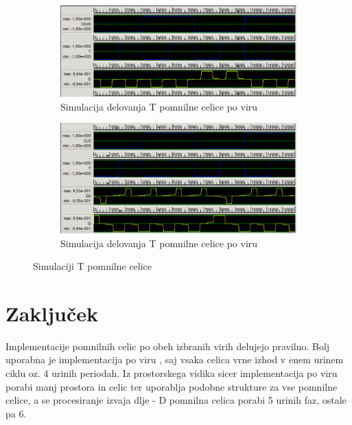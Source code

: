 \documentclass[a4paper, 11pt]{article}
\begin{document}
\begin{figure}[h!]
	\begin{subfigure}[b]{\textwidth}
	\includegraphics[width=\textwidth]{../img/vir_4/sim_t.png}
	\caption{Simulacija delovanja T pomnilne celice po viru \cite{quantum_dot}}
	\label{fig-t-1-sim}
	\end{subfigure}
	\begin{subfigure}[b]{\textwidth}
	\includegraphics[width=\textwidth]{../img/vir_5/sim_t.png}
	\caption{Simulacija delovanja T pomnilne celice po viru \cite{a_novel_approach}}
	\label{fig-t-2-sim}
	\end{subfigure}
	\caption{Simulaciji T pomnilne celice}
	\label{fig-t-sim}
\end{figure}

\section{Zaključek}
Implementacije pomnilnih celic po obeh izbranih virih delujejo pravilno. Bolj uporabna je implementacija po viru \cite{quantum_dot}, saj vsaka celica vrne izhod v enem urinem ciklu oz. $4$ urinih periodah. Iz prostorskega vidika sicer implementacija po viru \cite{a_novel_approach} porabi manj prostora in celic ter uporablja podobne strukture za vse pomnilne celice, a se procesiranje izvaja dlje - D pomnilna celica porabi 5 urinih faz, ostale pa 6.


 
\end{document}
